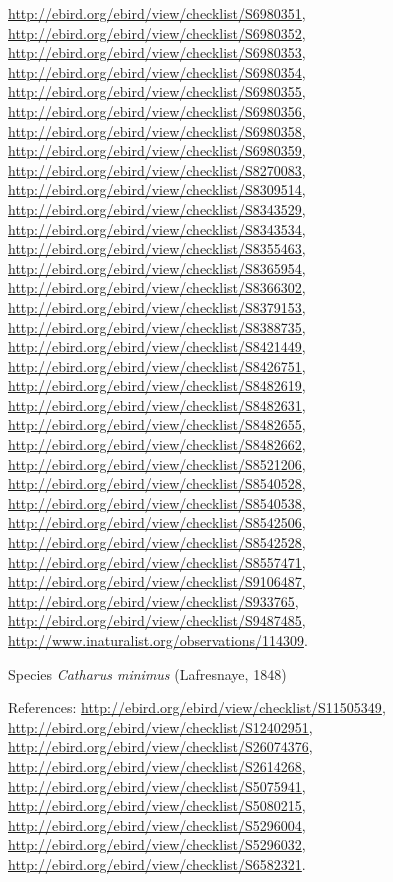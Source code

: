 \documentclass[9pt, article]{memoir}
\begin{document}
\begin{multicols}{2}
\url{http://ebird.org/ebird/view/checklist/S6980351}, 
\url{http://ebird.org/ebird/view/checklist/S6980352}, 
\url{http://ebird.org/ebird/view/checklist/S6980353}, 
\url{http://ebird.org/ebird/view/checklist/S6980354}, 
\url{http://ebird.org/ebird/view/checklist/S6980355}, 
\url{http://ebird.org/ebird/view/checklist/S6980356}, 
\url{http://ebird.org/ebird/view/checklist/S6980358}, 
\url{http://ebird.org/ebird/view/checklist/S6980359}, 
\url{http://ebird.org/ebird/view/checklist/S8270083}, 
\url{http://ebird.org/ebird/view/checklist/S8309514}, 
\url{http://ebird.org/ebird/view/checklist/S8343529}, 
\url{http://ebird.org/ebird/view/checklist/S8343534}, 
\url{http://ebird.org/ebird/view/checklist/S8355463}, 
\url{http://ebird.org/ebird/view/checklist/S8365954}, 
\url{http://ebird.org/ebird/view/checklist/S8366302}, 
\url{http://ebird.org/ebird/view/checklist/S8379153}, 
\url{http://ebird.org/ebird/view/checklist/S8388735}, 
\url{http://ebird.org/ebird/view/checklist/S8421449}, 
\url{http://ebird.org/ebird/view/checklist/S8426751}, 
\url{http://ebird.org/ebird/view/checklist/S8482619}, 
\url{http://ebird.org/ebird/view/checklist/S8482631}, 
\url{http://ebird.org/ebird/view/checklist/S8482655}, 
\url{http://ebird.org/ebird/view/checklist/S8482662}, 
\url{http://ebird.org/ebird/view/checklist/S8521206}, 
\url{http://ebird.org/ebird/view/checklist/S8540528}, 
\url{http://ebird.org/ebird/view/checklist/S8540538}, 
\url{http://ebird.org/ebird/view/checklist/S8542506}, 
\url{http://ebird.org/ebird/view/checklist/S8542528}, 
\url{http://ebird.org/ebird/view/checklist/S8557471}, 
\url{http://ebird.org/ebird/view/checklist/S9106487}, 
\url{http://ebird.org/ebird/view/checklist/S933765}, 
\url{http://ebird.org/ebird/view/checklist/S9487485}, 
\url{http://www.inaturalist.org/observations/114309}.

\vspace{6pt}\noindent\hspace{36pt}Species \textit{Catharus minimus} (Lafresnaye, 1848)


\vspace{6pt}References: 
\url{http://ebird.org/ebird/view/checklist/S11505349}, 
\url{http://ebird.org/ebird/view/checklist/S12402951}, 
\url{http://ebird.org/ebird/view/checklist/S26074376}, 
\url{http://ebird.org/ebird/view/checklist/S2614268}, 
\url{http://ebird.org/ebird/view/checklist/S5075941}, 
\url{http://ebird.org/ebird/view/checklist/S5080215}, 
\url{http://ebird.org/ebird/view/checklist/S5296004}, 
\url{http://ebird.org/ebird/view/checklist/S5296032}, 
\url{http://ebird.org/ebird/view/checklist/S6582321}.


\end{multicols}
\end{document}
